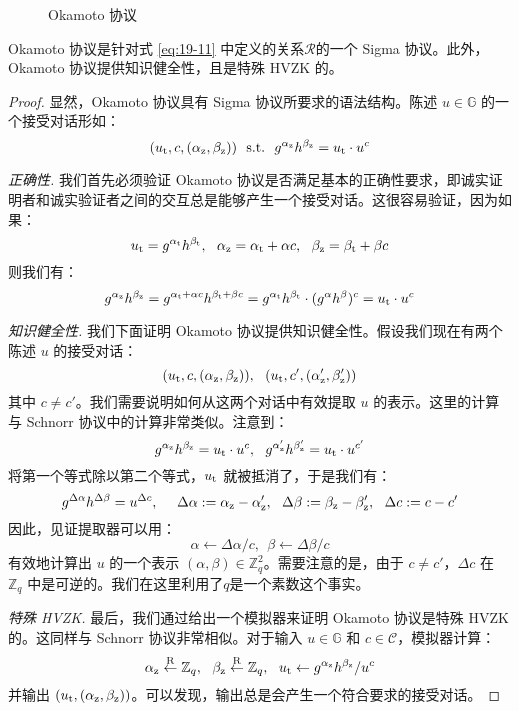 \begin{figure}
  \centering
  
  \caption{Okamoto 协议}
  \label{fig:19-6}
\end{figure}

\begin{theorem}
Okamoto 协议是针对式 \ref{eq:19-11} 中定义的关系$\mathcal{R}$的一个 Sigma 协议。此外，Okamoto 协议提供知识健全性，且是特殊 HVZK 的。
\end{theorem}

\begin{proof}
显然，Okamoto 协议具有 Sigma 协议所要求的语法结构。陈述 $u\in\mathbb{G}$ 的一个接受对话形如：
$$
(u_{\rm t},c,(\alpha_{\rm z},\beta_{\rm z})) \text{~~s.t.~~} g^{\alpha_{\rm z}}h^{\beta_{\rm z}}=u_{\rm t}\cdot u^c
$$

\noindent
\emph{正确性.}
我们首先必须验证 Okamoto 协议是否满足基本的正确性要求，即诚实证明者和诚实验证者之间的交互总是能够产生一个接受对话。这很容易验证，因为如果：
$$
u_{\rm t}=g^{\alpha_{\rm t}}h^{\beta_{\rm t}},~~
\alpha_{\rm z}=\alpha_{\rm t}+\alpha c,~~
\beta_{\rm z}=\beta_{\rm t}+\beta c
$$
则我们有：
$$
g^{\alpha_{\rm z}}h^{\beta_{\rm z}}=
g^{\alpha_{\rm t}+\alpha c}h^{\beta_{\rm t}+\beta c}=
g^{\alpha_{\rm t}}h^{\beta_{\rm t}}\cdot(g^\alpha h^\beta)^c=
u_{\rm t}\cdot u^c
$$

\noindent
\emph{知识健全性.}
我们下面证明 Okamoto 协议提供知识健全性。假设我们现在有两个陈述 $u$ 的接受对话：
$$
(u_{\rm t},c,(\alpha_{\rm z},\beta_{\rm z})),~~
(u_{\rm t},c',(\alpha_{\rm z}',\beta_{\rm z}'))
$$
其中 $c\neq c'$。我们需要说明如何从这两个对话中有效提取 $u$ 的表示。这里的计算与 Schnorr 协议中的计算非常类似。注意到：
$$
g^{\alpha_{\rm z}}h^{\beta_{\rm z}}=u_{\rm t}\cdot u^c,~~
g^{\alpha_{\rm z}'}h^{\beta_{\rm z}'}=u_{\rm t}\cdot u^{c'}
$$
将第一个等式除以第二个等式，$u_{\rm t}$ 就被抵消了，于是我们有：
$$
g^{\Delta\alpha}h^{\Delta\beta}=u^{\Delta c},~~~~
\Delta\alpha:=\alpha_{\rm z}-\alpha_{\rm z}',~~
\Delta\beta:=\beta_{\rm z}-\beta_{\rm z}',~~
\Delta c:=c-c'
$$
因此，见证提取器可以用：
$$
\alpha\leftarrow{\Delta\alpha}/{c},~~
\beta\leftarrow{\Delta\beta}/{c}
$$
有效地计算出 $u$ 的一个表示 $(\alpha,\beta)\in\mathbb{Z}_q^2$。需要注意的是，由于 $c\neq c'$，$\Delta c$ 在 $\mathbb{Z}_q$ 中是可逆的。我们在这里利用了$q$是一个素数这个事实。

\vspace{5pt}

\noindent
\emph{特殊 HVZK.}
最后，我们通过给出一个模拟器来证明 Okamoto 协议是特殊 HVZK 的。这同样与 Schnorr 协议非常相似。对于输入 $u\in\mathbb{G}$ 和 $c\in\mathcal{C}$，模拟器计算：
$$
\alpha_{\rm z}\overset{\rm R}\leftarrow\mathbb{Z}_q,~~
\beta_{\rm z}\overset{\rm R}\leftarrow\mathbb{Z}_q,~~
u_{\rm t}\leftarrow{g^{\alpha_{\rm z}}h^{\beta_{\rm z}}}/{u^c}
$$
并输出 $(u_{\rm t},(\alpha_{\rm z},\beta_{\rm z}))$。可以发现，输出总是会产生一个符合要求的接受对话。


\end{proof}

